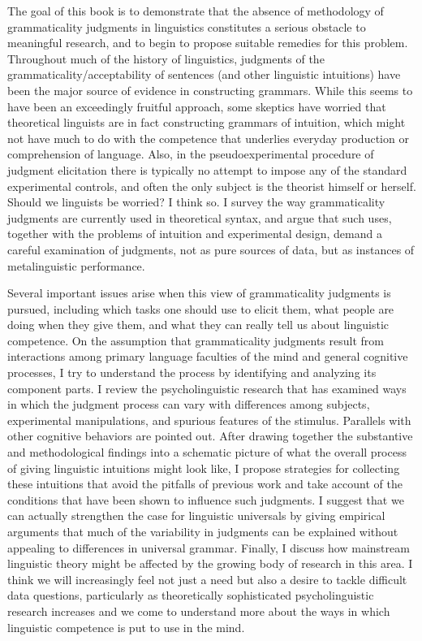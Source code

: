 
The goal of this book is to demonstrate that the absence of methodology of grammaticality judgments in linguistics constitutes a serious obstacle to meaningful research, and to begin to propose suitable remedies for this problem. Throughout much of the history of linguistics, judgments of the grammaticality/acceptability of sentences (and other linguistic intuitions) have been the major source of evidence in constructing grammars. While this seems to have been an exceedingly fruitful approach, some skeptics have worried that theoretical linguists are in fact constructing grammars of intuition, which might not have much to do with the competence that underlies everyday production or comprehension of language. Also, in the pseudoexperimental procedure of judgment elicitation there is typically no attempt to impose any of the standard experimental controls, and often the only subject is the theorist himself or herself. Should we linguists be worried? I think so. I survey the way grammaticality judgments are currently used in theoretical syntax, and argue that such uses, together with the problems of intuition and experimental design, demand a careful examination of judgments, not as pure sources of data, but as instances of metalinguistic performance.

Several important issues arise when this view of grammaticality judgments is pursued, including which tasks one should use to elicit them, what people are doing when they give them, and what they can really tell us about linguistic competence. On the assumption that grammaticality judgments result from interactions among primary language faculties of the mind and general cognitive processes, I try to understand the process by identifying and analyzing its component parts. I review the psycholinguistic research that has examined ways in which the judgment process can vary with differences among subjects, experimental manipulations, and spurious features of the stimulus. Parallels with other cognitive behaviors are pointed out. After drawing together the substantive and methodological findings into a schematic picture of what the overall process of giving linguistic intuitions might look like, I propose strategies for collecting these intuitions that avoid the pitfalls of previous work and take account of the conditions that have been shown to influence such judgments. I suggest that we can actually strengthen the case for linguistic universals by giving empirical arguments that much of the variability in judgments can be explained without appealing to differences in universal grammar. Finally, I discuss how mainstream linguistic theory might be affected by the growing body of research in this area. I think we will increasingly feel not just a need but also a desire to tackle difficult data questions, particularly as theoretically sophisticated psycholinguistic research increases and we come to understand more about the ways in which linguistic competence is put to use in the mind.
